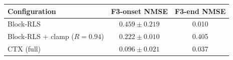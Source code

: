 \begin{tabular}{lcc}
\toprule
Configuration & F3-onset NMSE & F3-end NMSE \\
\midrule
Block-RLS & $0.459\pm0.219$ & 0.010 \\
Block-RLS + clamp ($R{=}0.94$) & $0.222\pm0.010$ & 0.405 \\
CTX (full) & $\mathbf{0.096\pm0.021}$ & 0.037 \\
\bottomrule
\end{tabular}